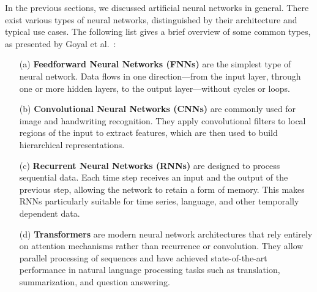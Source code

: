 In the previous sections, we discussed artificial neural networks in general.  
There exist various types of neural networks, distinguished by their architecture and typical use cases.  
The following list gives a brief overview of some common types, as presented by Goyal et al.~\cite{goyal_deep_2018}:

\begin{enumerate}
    \item[(a)] \textbf{Feedforward Neural Networks (FNNs)} are the simplest type of neural network.  
    Data flows in one direction—from the input layer, through one or more hidden layers, to the output layer—without cycles or loops.

    \item[(b)] \textbf{Convolutional Neural Networks (CNNs)} are commonly used for image and handwriting recognition.  
    They apply convolutional filters to local regions of the input to extract features, which are then used to build hierarchical representations.

    \item[(c)] \textbf{Recurrent Neural Networks (RNNs)} are designed to process sequential data.  
    Each time step receives an input and the output of the previous step, allowing the network to retain a form of memory.  
    This makes RNNs particularly suitable for time series, language, and other temporally dependent data.

    \item[(d)] \textbf{Transformers} \cite{vaswani_attention_2023} are modern neural network architectures that rely entirely on attention mechanisms rather than recurrence or convolution.  
    They allow parallel processing of sequences and have achieved state-of-the-art performance in natural language processing tasks such as translation, summarization, and question answering.
\end{enumerate}
